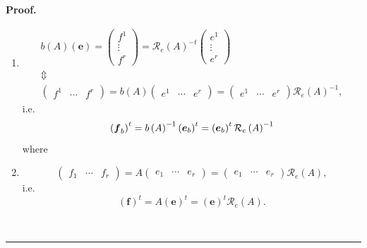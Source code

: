 \documentclass[aps,preprint]{revtex4}
\newenvironment{proof}[1][Proof]{\noindent\textbf{#1.} }{\ \rule{0.5em}{0.5em}}
\begin{document}
\begin{proof}
\begin{enumerate}
\item 
\begin{gather}
b\left( A\right) \left( \boldsymbol{e}\right) =\left( 
\begin{array}{c}
f^{1} \\ 
\vdots \\ 
f^{r}%
\end{array}%
\right) =\mathcal{R}_{e}\left( A\right) ^{-t}\left( 
\begin{array}{c}
e^{1} \\ 
\vdots \\ 
e^{r}%
\end{array}%
\right) \\
\Updownarrow \\
\left( 
\begin{array}{ccc}
f^{1} & \cdots & f^{r}%
\end{array}%
\right) =b\left( A\right) \left( 
\begin{array}{ccc}
e^{1} & \cdots & e^{r}%
\end{array}%
\right) =\left( 
\begin{array}{ccc}
e^{1} & \cdots & e^{r}%
\end{array}%
\right) \mathcal{R}_{e}\left( A\right) ^{-1},
\end{gather}%
i.e. 
\begin{equation}
\left( \boldsymbol{f}_{b}\right) ^{t}=b\left( A\right) ^{-1}\left( 
\boldsymbol{e}_{b}\right) ^{t}=\left( \boldsymbol{e}_{b}\right) ^{t}\mathcal{%
R}_{e}\left( A\right) ^{-1}
\end{equation}%
where

\item 
\begin{equation}
\left( 
\begin{array}{ccc}
f_{1} & \cdots & f_{r}%
\end{array}%
\right) =A\left( 
\begin{array}{ccc}
e_{1} & \cdots & e_{r}%
\end{array}%
\right) =\left( 
\begin{array}{ccc}
e_{1} & \cdots & e_{r}%
\end{array}%
\right) \mathcal{R}_{e}\left( A\right) ,
\end{equation}%
i.e. 
\begin{equation}
\left( \boldsymbol{f}\right) ^{t}=A\left( \boldsymbol{e}\right) ^{t}=\left( 
\boldsymbol{e}\right) ^{t}\mathcal{R}_{e}\left( A\right) .
\end{equation}
\end{enumerate}
\end{proof}
\end{document}

